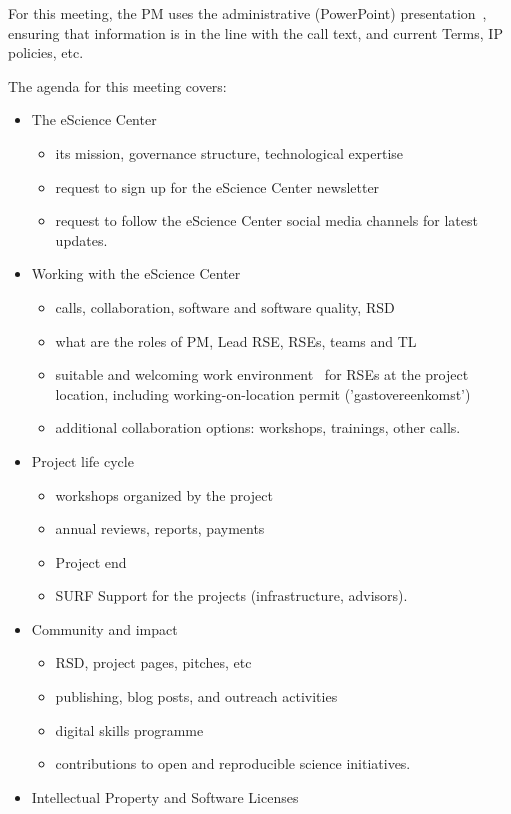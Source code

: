 For this meeting, the PM uses the administrative (PowerPoint) presentation~\cite{proj-templates}, ensuring that information is in the line
with the call text, and current Terms, IP policies, etc.

The agenda for this meeting covers:
\begin{itemize}
\item The eScience Center
\begin{itemize}
\item its mission, governance structure, technological expertise
\item request to sign up for the eScience Center newsletter
\item request to follow the eScience Center social media channels for latest updates.
\end{itemize}
\item Working with the eScience Center
\begin{itemize}
\item calls, collaboration, software and software quality, RSD
\item what are the roles of PM, Lead RSE, RSEs, teams and TL
\item suitable and welcoming work environment~\cite{arbo} for RSEs at the project location, including
working-on-location permit ('gastovereenkomst')
\item additional collaboration options: workshops, trainings, other calls.
\end{itemize}
\item Project life cycle
\begin{itemize}
\item workshops organized by the project
\item annual reviews, reports, payments
\item Project end
\item SURF Support for the projects (infrastructure, advisors).
\end{itemize}
\item Community and impact
\begin{itemize}
\item RSD, project pages, pitches, etc
\item publishing, blog posts, and outreach activities
\item digital skills programme
\item contributions to open and reproducible science initiatives.
\end{itemize}
\item Intellectual Property and Software Licenses

\end{itemize}
